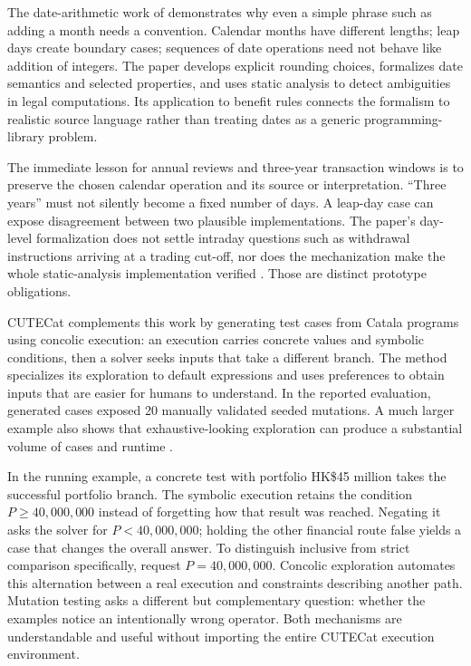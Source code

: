\documentclass[12pt,a4paper,oneside,openany]{book}
\begin{document}
The date-arithmetic work of \citet{dates2024} demonstrates why even a simple phrase
such as adding a month needs a convention. Calendar months have different
lengths; leap days create boundary cases; sequences of date operations need not
behave like addition of integers. The paper develops explicit rounding choices,
formalizes date semantics and selected properties, and uses static analysis to
detect ambiguities in legal computations. Its application to benefit rules
connects the formalism to realistic source language rather than treating dates
as a generic programming-library problem.

The immediate lesson for annual reviews and three-year transaction windows is
to preserve the chosen calendar operation and its source or interpretation.
``Three years'' must not silently become a fixed number of days. A leap-day case
can expose disagreement between two plausible implementations. The paper's
day-level formalization does not settle intraday questions such as withdrawal
instructions arriving at a trading cut-off, nor does the mechanization make the
whole static-analysis implementation verified
\citep[secs.~2--6]{dates2024}. Those are distinct prototype obligations.

CUTECat complements this work by generating test cases from Catala programs using
concolic execution: an execution carries concrete values and symbolic conditions,
then a solver seeks inputs that take a different branch. The method specializes
its exploration to default expressions and uses preferences to obtain inputs
that are easier for humans to understand. In the reported evaluation, generated
cases exposed 20 manually validated seeded mutations. A much larger example also
shows that exhaustive-looking exploration can produce a substantial volume of
cases and runtime \citep[secs.~3--5]{cutecat2025}.

In the running example, a concrete test with portfolio HK\$45 million takes
the successful portfolio branch. The symbolic execution retains the condition
$P\geq 40{,}000{,}000$ instead of forgetting how that result was reached.
Negating it asks the solver for $P<40{,}000{,}000$; holding the other financial
route false yields a case that changes the overall answer. To distinguish
inclusive from strict comparison specifically, request $P=40{,}000{,}000$.
Concolic exploration automates this alternation between a real execution and
constraints describing another path. Mutation testing asks a different but
complementary question: whether the examples notice an intentionally wrong
operator. Both mechanisms are understandable and useful without importing
the entire CUTECat execution environment.
\end{document}
